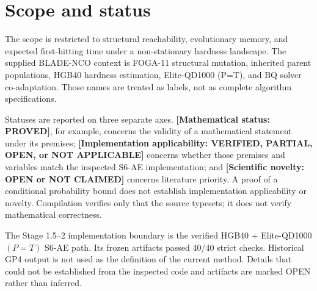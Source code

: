 \documentclass[11pt]{article}
\newcommand{\mstatus}[1]{\textbf{[Mathematical status: #1]}}
\newcommand{\istatus}[1]{\textbf{[Implementation applicability: #1]}}
\newcommand{\nstatus}[1]{\textbf{[Scientific novelty: #1]}}
\begin{document}
\begin{abstract}
Stage 3B removes those unsupported premises and audits what is observable.
It proves an exact exchange identity between Elite-QD acquisition and pure
global HGB Top10k, making the surrogate-score opportunity cost computable.
An exact finite-pool indistinguishability construction shows that selectively
verified labels do not identify full-pool niche maxima, elite true-hardness
regret, hard-tail recall, or the true Elite-QD-versus-global comparison.  The
missing paired comparison can be completed with at most 1,000 same-checkpoint
labels, but those labels are not present in the frozen artifacts.
\end{abstract}

\section{Scope and status}
The scope is restricted to structural reachability, evolutionary memory, and expected first-hitting time under a non-stationary hardness landscape. The supplied BLADE-NCO context is FOGA-11 structural mutation, inherited parent populations, HGB40 hardness estimation, Elite-QD1000 (P=T), and BQ solver co-adaptation. Those names are treated as labels, not as complete algorithm specifications.

Statuses are reported on three separate axes. \mstatus{PROVED}, for example,
concerns the validity of a mathematical statement under its premises;
\istatus{VERIFIED, PARTIAL, OPEN, or NOT APPLICABLE} concerns whether those
premises and variables match the inspected S6-AE implementation; and
\nstatus{OPEN or NOT CLAIMED} concerns literature priority. A proof of a
conditional probability bound does not establish implementation applicability
or novelty. Compilation verifies only that the source typesets; it does not
verify mathematical correctness.

The Stage 1.5--2 implementation boundary is the verified HGB40 + Elite-QD1000
$(P=T)$ S6-AE path. Its frozen artifacts passed 40/40 strict checks. Historical
GP4 output is not used as the definition of the current method. Details that
could not be established from the inspected code and artifacts are marked
OPEN rather than inferred.
\end{document}
